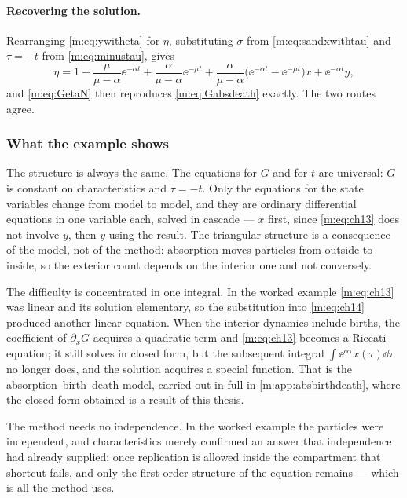 \paragraph{Recovering the solution.}
Rearranging \cref{m:eq:ywitheta} for $\eta$, substituting $\sigma$ from
\cref{m:eq:sandxwithtau} and $\tau=-t$ from \cref{m:eq:minustau}, gives
\begin{equation*}
\eta = 1-\frac{\mu}{\mu-\alpha}\ee^{-\alpha t} + \frac{\alpha}{\mu-\alpha}\ee^{-\mu t}
+ \frac{\alpha}{\mu-\alpha}\bigl(\ee^{-\alpha t}-\ee^{-\mu t}\bigr)x
+ \ee^{-\alpha t}y ,
\end{equation*}
and \cref{m:eq:GetaN} then reproduces \cref{m:eq:Gabsdeath} exactly. The two routes
agree.

\subsubsection{What the example shows}
\label{m:sec:mocwhat}

The structure is always the same. The equations for $G$ and for $t$ are universal:
$G$ is constant on characteristics and $\tau=-t$. Only the equations for the state
variables change from model to model, and they are ordinary differential equations
in one variable each, solved in cascade --- $x$ first, since \cref{m:eq:ch13} does
not involve $y$, then $y$ using the result. The triangular structure is a
consequence of the model, not of the method: absorption moves particles from
outside to inside, so the exterior count depends on the interior one and not
conversely.

The difficulty is concentrated in one integral. In the worked example
\cref{m:eq:ch13} was linear and its solution elementary, so the substitution into
\cref{m:eq:ch14} produced another linear equation. When the interior dynamics
include births, the coefficient of $\partial_xG$ acquires a quadratic term and
\cref{m:eq:ch13} becomes a Riccati equation; it still solves in closed form, but the
subsequent integral $\int\ee^{\alpha\tau}x(\tau)\dd\tau$ no longer does, and the
solution acquires a special function. That is the absorption--birth--death model,
carried out in full in \cref{m:app:absbirthdeath}, where the closed form obtained is
a result of this thesis.

The method needs no independence. In the worked example the particles were
independent, and characteristics merely confirmed an answer that independence had
already supplied; once replication is allowed inside the compartment that shortcut
fails, and only the first-order structure of the equation remains --- which is all
the method uses.

\FloatBarrier
